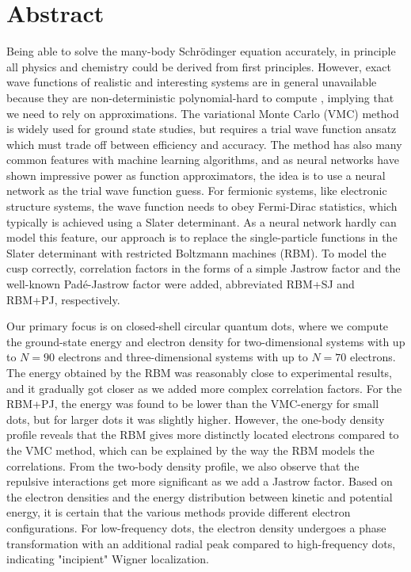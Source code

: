 \newpage
\section*{Abstract}
Being able to solve the many-body Schrödinger equation accurately, in principle all physics and chemistry could be derived from first principles. However, exact wave functions of realistic and interesting systems are in general unavailable because they are non-deterministic polynomial-hard to compute \cite{troyer_computational_2005}, implying that we need to rely on approximations. The variational Monte Carlo (VMC) method is widely used for ground state studies, but requires a trial wave function ansatz which must trade off between efficiency and accuracy. The method has also many common features with machine learning algorithms, and as neural networks have shown impressive power as function approximators, the idea is to use a neural network as the trial wave function guess. For fermionic systems, like electronic structure systems, the wave function needs to obey Fermi-Dirac statistics, which typically is achieved using a Slater determinant. As a neural network hardly can model this feature, our approach is to replace the single-particle functions in the Slater determinant with restricted Boltzmann machines (RBM). To model the cusp correctly, correlation factors in the forms of a simple Jastrow factor and the well-known Padé-Jastrow factor were added, abbreviated RBM+SJ and RBM+PJ, respectively.

Our primary focus is on closed-shell circular quantum dots, where we compute the ground-state energy and electron density for two-dimensional systems with up to $N=90$ electrons and three-dimensional systems with up to $N=70$ electrons. The energy obtained by the RBM was reasonably close to experimental results, and it gradually got closer as we added more complex correlation factors. For the RBM+PJ, the energy was found to be lower than the VMC-energy for small dots, but for larger dots it was slightly higher. However, the one-body density profile reveals that the RBM gives more distinctly located electrons compared to the VMC method, which can be explained by the way the RBM models the correlations. From the two-body density profile, we also observe that the repulsive interactions get more significant as we add a Jastrow factor. Based on the electron densities and the energy distribution between kinetic and potential energy, it is certain that the various methods provide different electron configurations. For low-frequency dots, the electron density undergoes a phase transformation with an additional radial peak compared to high-frequency dots, indicating "incipient" Wigner localization.

